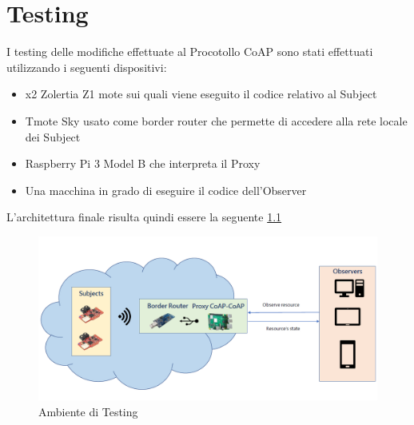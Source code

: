 

\chapter{Testing}
  I testing delle modifiche effettuate al Procotollo CoAP sono stati effettuati utilizzando i seguenti dispositivi:
  \begin{itemize}
    \item x2 Zolertia Z1 mote sui quali viene eseguito il codice relativo al Subject
    \item Tmote Sky usato come border router che permette di accedere alla rete locale dei Subject
    \item Raspberry Pi 3 Model B che interpreta il Proxy
    \item Una macchina in grado di eseguire il codice dell'Observer
  \end{itemize}
  L'architettura finale risulta quindi essere la seguente \ref{fig:architettura}
  \begin{figure}
    \includegraphics[width=\linewidth]{../Immagini/ArchitetturaGenerale.png}
    \caption{Ambiente di Testing}
    \label{fig:architettura}
  \end{figure}
